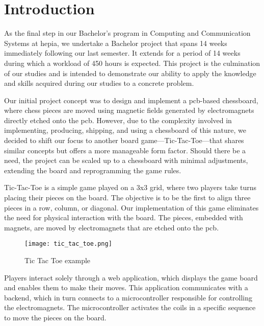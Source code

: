 \chapter*{Introduction}

As the final step in our Bachelor's program in Computing and Communication Systems at \gls{hepia}, we undertake a Bachelor project that spans 14 weeks immediately following our last semester. It extends for a period of 14 weeks during which a workload of 450 hours is expected. This project is the culmination of our studies and is intended to demonstrate our ability to apply the knowledge and skills acquired during our studies to a concrete problem.

Our initial project concept was to design and implement a \gls{pcb}-based chessboard, where chess pieces are moved using magnetic fields generated by electromagnets directly etched onto the \gls{pcb}. However, due to the complexity involved in implementing, producing, shipping, and using a chessboard of this nature, we decided to shift our focus to another board game—Tic-Tac-Toe—that shares similar concepts but offers a more manageable form factor. Should there be a need, the project can be scaled up to a chessboard with minimal adjustments, extending the board and reprogramming the game rules.

Tic-Tac-Toe is a simple game played on a 3x3 grid, where two players take turns placing their pieces on the board. The objective is to be the first to align three pieces in a row, column, or diagonal. Our implementation of this game eliminates the need for physical interaction with the board. The pieces, embedded with magnets, are moved by electromagnets that are etched onto the \gls{pcb}.

\begin{figure}[H]
	\centering
	\texttt{[image: tic\_tac\_toe.png]}
	\caption[Tic Tac Toe example]{Tic Tac Toe example}
	\label{fig:tictactoe_game}
\end{figure}

Players interact solely through a web application, which displays the game board and enables them to make their moves. This application communicates with a backend, which in turn connects to a microcontroller responsible for controlling the electromagnets. The microcontroller activates the coils in a specific sequence to move the pieces on the board.

